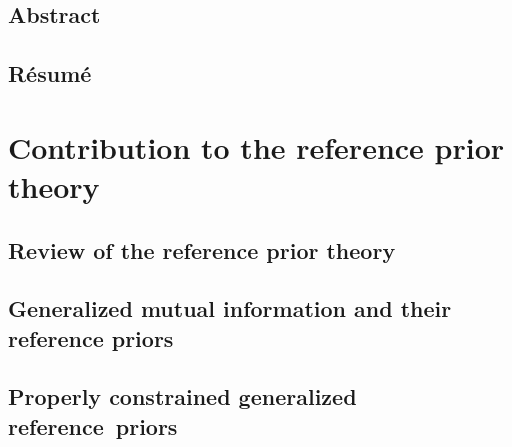 \documentclass[a4paper]{book}
\begin{document}
\pagestyle{plain}



\chapter*{Abstract}



\abstractEN



\chapter*{Résumé}


\abstractFR


\dominitoc
\setcounter{tocdepth}{1}
\tableofcontents
\newpage

\pagestyle{fancy}\thispagestyle{plain}






\part{Contribution to the reference prior theory}\label{part:ref-theory}

\chapter{Review of the reference prior theory}\label{chap:intro-ref}




\chapter{Generalized mutual information and their reference priors}\label{chap:ref-generalized}




\chapter{Properly constrained generalized reference~priors}\label{chap:constrained-prior}
\end{document}
